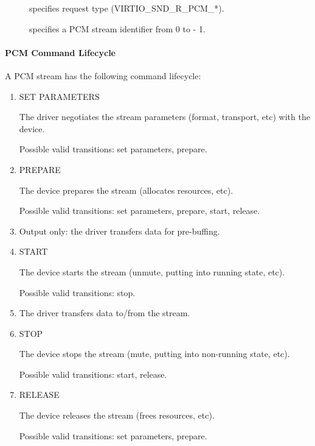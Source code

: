 \begin{description}
\item[] specifies request type (VIRTIO_SND_R_PCM_*).
\item[] specifies a PCM stream identifier from 0 to  - 1.
\end{description}

\paragraph{PCM Command Lifecycle}

A PCM stream has the following command lifecycle:

\begin{enumerate}
\item SET PARAMETERS

The driver negotiates the stream parameters (format, transport, etc) with
the device.

Possible valid transitions: set parameters, prepare.

\item PREPARE

The device prepares the stream (allocates resources, etc).

Possible valid transitions: set parameters, prepare, start, release.

\item Output only: the driver transfers data for pre-buffing.

\item START

The device starts the stream (unmute, putting into running state, etc).

Possible valid transitions: stop.

\item The driver transfers data to/from the stream.

\item STOP

The device stops the stream (mute, putting into non-running state, etc).

Possible valid transitions: start, release.

\item RELEASE

The device releases the stream (frees resources, etc).

Possible valid transitions: set parameters, prepare.

\end{enumerate}

